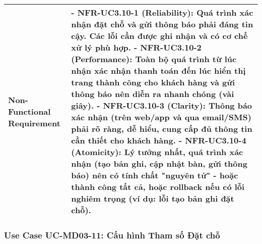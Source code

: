 \begin{longtable}{|m{4cm}|p{11cm}|}
\hline
Non-Functional Requirement & - \textbf{NFR-UC3.10-1 (Reliability):} Quá trình xác nhận đặt chỗ và gửi thông báo phải đáng tin cậy. Các lỗi cần được ghi nhận và có cơ chế xử lý phù hợp. \newline - \textbf{NFR-UC3.10-2 (Performance):} Toàn bộ quá trình từ lúc nhận xác nhận thanh toán đến lúc hiển thị trang thành công cho khách hàng và gửi thông báo nên diễn ra nhanh chóng (vài giây). \newline - \textbf{NFR-UC3.10-3 (Clarity):} Thông báo xác nhận (trên web/app và qua email/SMS) phải rõ ràng, dễ hiểu, cung cấp đủ thông tin cần thiết cho khách hàng. \newline - \textbf{NFR-UC3.10-4 (Atomicity):} Lý tưởng nhất, quá trình xác nhận (tạo bản ghi, cập nhật bàn, gửi thông báo) nên có tính chất "nguyên tử" - hoặc thành công tất cả, hoặc rollback nếu có lỗi nghiêm trọng (ví dụ: lỗi tạo bản ghi đặt chỗ). \\
\hline
\end{longtable}

\subsubsection{Use Case UC-MD03-11: Cấu hình Tham số Đặt chỗ}

